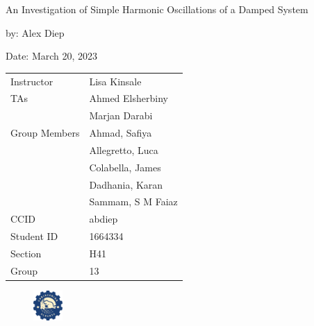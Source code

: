 \documentclass[letterpaper,12pt]{article} %
\begin{document}
\begin{titlepage}
    \centering
    \vspace*{2cm} %
    
    \Huge {An Investigation of Simple Harmonic Oscillations of a Damped System} \\
    \vspace{1cm} %
    
    \Large by: Alex Diep \\
    \vspace{1cm} %

    \Large Date: March 20, 2023 \\ %
    \vspace{2cm} %

    \begin{table}[h]
        \centering
        \begin{tabular}{ll}
            Instructor & Lisa Kinsale \\
            TAs & Ahmed Elsherbiny \\
            & Marjan Darabi \vspace{0.5cm} \\
            Group Members & Ahmad, Safiya \\
            & Allegretto, Luca \\
            & Colabella, James \\
            & Dadhania, Karan \\
            & Sammam, S M Faiaz \vspace{0.5cm} \\
            CCID & abdiep \\
            Student ID & 1664334 \\
            Section & H41 \\
            Group & 13 \\
        \end{tabular}
    \end{table}
    \begin{figure}[h]
        \centering
        \includegraphics[width=0.1\textwidth]{uofa_engineering_logo.png}
    \end{figure}
    \vfill %
\end{titlepage}
\renewcommand\arraystretch{1.5}
\end{document}
